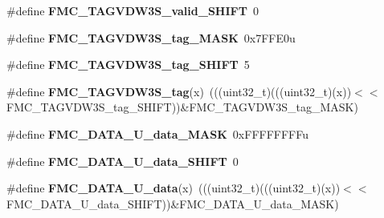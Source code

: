 \begin{DoxyCompactItemize}
\item 
\#define {\bfseries F\+M\+C\+\_\+\+T\+A\+G\+V\+D\+W3\+S\+\_\+valid\+\_\+\+S\+H\+I\+FT}~0\hypertarget{group__FMC__Register__Masks_gae63177b0f086e164153f0b5f7240f11f}{}\label{group__FMC__Register__Masks_gae63177b0f086e164153f0b5f7240f11f}

\item 
\#define {\bfseries F\+M\+C\+\_\+\+T\+A\+G\+V\+D\+W3\+S\+\_\+tag\+\_\+\+M\+A\+SK}~0x7\+F\+F\+E0u\hypertarget{group__FMC__Register__Masks_ga541edb8adcd9202130abaea64cd8bf9a}{}\label{group__FMC__Register__Masks_ga541edb8adcd9202130abaea64cd8bf9a}

\item 
\#define {\bfseries F\+M\+C\+\_\+\+T\+A\+G\+V\+D\+W3\+S\+\_\+tag\+\_\+\+S\+H\+I\+FT}~5\hypertarget{group__FMC__Register__Masks_ga575e10b20b9366a19e6cbc839fc3353b}{}\label{group__FMC__Register__Masks_ga575e10b20b9366a19e6cbc839fc3353b}

\item 
\#define {\bfseries F\+M\+C\+\_\+\+T\+A\+G\+V\+D\+W3\+S\+\_\+tag}(x)~(((uint32\+\_\+t)(((uint32\+\_\+t)(x))$<$$<$F\+M\+C\+\_\+\+T\+A\+G\+V\+D\+W3\+S\+\_\+tag\+\_\+\+S\+H\+I\+FT))\&F\+M\+C\+\_\+\+T\+A\+G\+V\+D\+W3\+S\+\_\+tag\+\_\+\+M\+A\+SK)\hypertarget{group__FMC__Register__Masks_gab4e42df87d80871e55707c4fa55d7ac5}{}\label{group__FMC__Register__Masks_gab4e42df87d80871e55707c4fa55d7ac5}

\item 
\#define {\bfseries F\+M\+C\+\_\+\+D\+A\+T\+A\+\_\+\+U\+\_\+data\+\_\+\+M\+A\+SK}~0x\+F\+F\+F\+F\+F\+F\+F\+Fu\hypertarget{group__FMC__Register__Masks_gae43292c4f0149b2bc25d115b7f5a6ee9}{}\label{group__FMC__Register__Masks_gae43292c4f0149b2bc25d115b7f5a6ee9}

\item 
\#define {\bfseries F\+M\+C\+\_\+\+D\+A\+T\+A\+\_\+\+U\+\_\+data\+\_\+\+S\+H\+I\+FT}~0\hypertarget{group__FMC__Register__Masks_gaa7a3b8bfa7aac03f2eef0b5e58dfbb44}{}\label{group__FMC__Register__Masks_gaa7a3b8bfa7aac03f2eef0b5e58dfbb44}

\item 
\#define {\bfseries F\+M\+C\+\_\+\+D\+A\+T\+A\+\_\+\+U\+\_\+data}(x)~(((uint32\+\_\+t)(((uint32\+\_\+t)(x))$<$$<$F\+M\+C\+\_\+\+D\+A\+T\+A\+\_\+\+U\+\_\+data\+\_\+\+S\+H\+I\+FT))\&F\+M\+C\+\_\+\+D\+A\+T\+A\+\_\+\+U\+\_\+data\+\_\+\+M\+A\+SK)\hypertarget{group__FMC__Register__Masks_ga1d2a8d98c4d178ac289f37108e881404}{}\label{group__FMC__Register__Masks_ga1d2a8d98c4d178ac289f37108e881404}


\end{DoxyCompactItemize}
